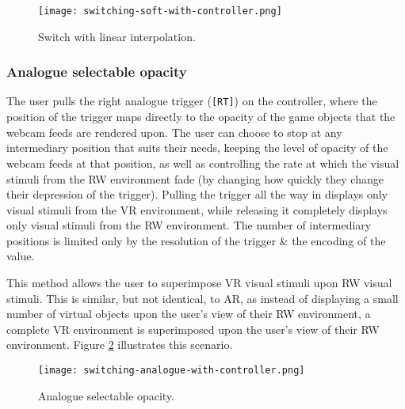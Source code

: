\begin{figure}[h]
	\begin{center}
		\texttt{[image: switching-soft-with-controller.png]}
		\caption{Switch with linear interpolation.}
		\label{scenario12}
	\end{center}
\end{figure}


\subsubsection{Analogue selectable opacity}
The user pulls the right analogue trigger (\texttt{[RT]}) on the controller, where the position of the trigger maps directly to the opacity of the game objects that the webcam feeds are rendered upon. The user can choose to stop at any intermediary position that suits their needs, keeping the level of opacity of the webcam feeds at that position, as well as controlling the rate at which the visual stimuli from the RW environment fade (by changing how quickly they change their depression of the trigger). Pulling the trigger all the way in displays only visual stimuli from the VR environment, while releasing it completely displays only visual stimuli from the RW environment. The number of intermediary positions is limited only by the resolution of the trigger \& the encoding of the value.

This method allows the user to superimpose VR visual stimuli upon RW visual stimuli. This is similar, but not identical, to AR, as instead of displaying a small number of virtual objects upon the user's view of their RW environment, a complete VR environment is superimposed upon the user's view of their RW environment. Figure \ref{scenario2} illustrates this scenario.

\begin{figure}[h]
	\begin{center}
		\texttt{[image: switching-analogue-with-controller.png]}
		\caption{Analogue selectable opacity.}
		\label{scenario2}
	\end{center}
\end{figure}



